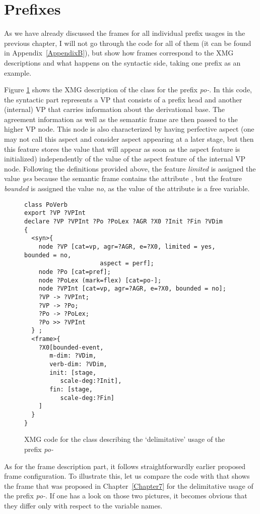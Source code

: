 \section{Prefixes}
As we have already discussed the frames for all individual prefix usages in the previous chapter, I will not go through the code for all of them (it can be found in Appendix~\ref{AppendixB}), but show how frames correspond to the XMG descriptions and what happens on the syntactic side, taking one prefix as an example.

Figure \ref{code:po} shows the XMG description of the class for the prefix \textit{po-}. In this code, the syntactic part represents a VP that consists of a prefix head and another (internal) VP that carries information about the derivational base. The agreement information as well as the semantic frame are then passed to the higher VP node. This node is also characterized by having perfective aspect (one may not call this aspect and consider aspect appearing at a later stage, but then this feature stores the value that will appear as soon as the aspect feature is initialized) independently of the value of the aspect feature of the internal VP node. Following the definitions provided above, the feature \textit{limited} is assigned the value \textit{yes} because the semantic frame contains the attribute \FIN, but the feature \textit{bounded} is assigned the value \textit{no}, as the value of the attribute \FIN is a free variable.

\begin{figure}
\begin{verbatim}
class PoVerb
export ?VP ?VPInt
declare ?VP ?VPInt ?Po ?PoLex ?AGR ?X0 ?Init ?Fin ?VDim
{
  <syn>{
    node ?VP [cat=vp, agr=?AGR, e=?X0, limited = yes, bounded = no, 
    				 aspect = perf];
    node ?Po [cat=pref];
    node ?PoLex (mark=flex) [cat=po-];
    node ?VPInt [cat=vp, agr=?AGR, e=?X0, bounded = no];
    ?VP -> ?VPInt;
    ?VP -> ?Po;
    ?Po -> ?PoLex;
    ?Po >> ?VPInt
  } ;
  <frame>{
    ?X0[bounded-event,
       m-dim: ?VDim,
       verb-dim: ?VDim,
       init: [stage, 
          scale-deg:?Init],
       fin: [stage, 
          scale-deg:?Fin]    
    ]
  }
}
\end{verbatim}
\caption{XMG code for the class describing the `delimitative' usage of the prefix \textit{po-}\label{code:po}}
\end{figure}

As for the frame description part, it follows straightforwardly earlier proposed frame configuration. To illustrate this, let us compare the code with  that shows the frame that was proposed in Chapter~\ref{Chapter7} for the delimitative usage of the prefix \textit{po-}. If one has a look on those two pictures, it becomes obvious that they differ only with respect to the variable names. 

